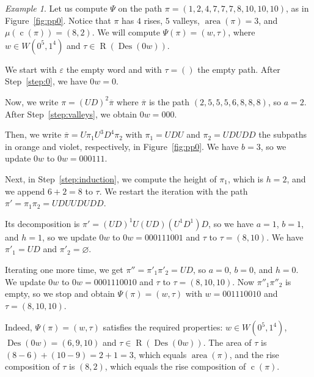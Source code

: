 \documentclass[reqno]{amsart}
\theoremstyle{plain}
\theoremstyle{definition}
\theoremstyle{remark}
\newtheorem{example}[theorem]{Example}
\DeclareMathOperator{\R}{R}
\DeclareMathOperator{\area}{area}
\DeclareMathOperator{\Des}{Des}
\DeclareMathOperator{\cc}{c}
\newcommand{\<}{\langle}
\renewcommand{\>}{\rangle}
\begin{document}
\begin{example}
    \label{ex:psi}
    Let us compute $\Psi$ on the path $\pi=(1,2,4,7,7,7,8,10,10,10)$, as in Figure~\ref{fig:pp0}. Notice that $\pi$ has $4$ rises, $5$ valleys, $\area(\pi) = 3$, and $\mu(\cc(\pi)) = (8,2)$. We will compute $\Psi(\pi) = (w,\tau)$, where $w \in W(0^5, 1^4)$ and $\tau \in \R(\Des(0w))$.

    We start with $\varepsilon$ the empty word and with $\tau=()$ the empty path. After Step~\ref{step:0}, we have $0w = 0$.

    Now, we write $\pi=(UD)^2\overline{\pi}$ where $\overline{\pi}$ is the path $(2,5,5,5,6,8,8,8)$, so $a=2$. After Step~\ref{step:valleys}, we obtain $0w = 000$.

    Then, we write $\overline{\pi}=U \pi_1 U^3 D^4 \pi_2$ with $\pi_1 = UDU$ and $\pi_2 = UDUDD$ the subpaths in orange and violet, respectively, in Figure~\ref{fig:pp0}. We have $b=3$, so we update $0w$ to $0w = 000111$.

    Next, in Step~\ref{step:induction}, we compute the height of $\pi_1$, which is $h=2$, and we append $6+2=8$ to $\tau$. We restart the iteration with the path $\pi' = \pi_1\pi_2 = UDUUDUDD$.

    Its decomposition is $\pi' = (UD)^1 U (UD) (U^1 D^1) D$, so we have $a=1$, $b=1$, and $h = 1$, so we update $0w$ to $0w = 000111001$ and $\tau$ to $\tau = (8, 10)$. We have $\pi'_1 = UD$ and $\pi'_2 = \varnothing$.

    Iterating one more time, we get $\pi'' = \pi'_1\pi'_2 = UD$, so $a=0$, $b=0$, and $h=0$. We update $0w$ to $0w = 0001110010$ and $\tau$ to $\tau = (8, 10, 10)$. Now $\pi''_1\pi''_2$ is empty, so we stop and obtain $\Psi(\pi) = (w,\tau)$ with $w = 001110010$ and $\tau=(8,10,10)$.

    Indeed, $\Psi(\pi) = (w,\tau)$ satisfies the required properties: $w \in W(0^5,1^4)$, $\Des(0w) = (6, 9, 10)$ and $\tau \in \R(\Des(0w))$. The area of $\tau$ is $(8-6) + (10-9) = 2 + 1 = 3$, which equals $\area(\pi)$, and the rise composition of $\tau$ is $(8,2)$, which equals the rise composition of $\cc(\pi)$.
\end{example}
\end{document}
